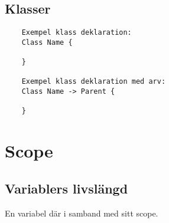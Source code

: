 \documentclass{TDP003mall}
\begin{document}
    \subsection{Klasser}
        \begin{verbatim}
    Exempel klass deklaration:
    Class Name {
      
    }

    Exempel klass deklaration med arv:
    Class Name -> Parent {
      
    }
\end{verbatim}

    \section{Scope}

    \subsection{Variablers livslängd}
    En variabel där i samband med sitt scope.
 
\end{document}
